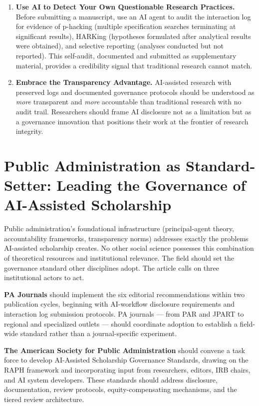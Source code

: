 \documentclass[12pt]{article}
\begin{document}
\begin{enumerate}
\item \textbf{Use AI to Detect Your Own Questionable Research Practices.}
Before submitting a manuscript, use an AI agent to audit the interaction log for evidence
of p-hacking (multiple specification searches terminating at significant results), HARKing
(hypotheses formulated after analytical results were obtained), and selective reporting
(analyses conducted but not reported). This self-audit, documented and submitted as
supplementary material, provides a credibility signal that traditional research cannot
match.

\item \textbf{Embrace the Transparency Advantage.}
AI-assisted research with preserved logs and documented governance protocols should be
understood as \emph{more} transparent and \emph{more} accountable than traditional research
with no audit trail. Researchers should frame AI disclosure not as a limitation but as a
governance innovation that positions their work at the frontier of research integrity.

\end{enumerate}

\section{Public Administration as Standard-Setter: Leading the Governance of AI-Assisted Scholarship}

Public administration's foundational infrastructure (principal-agent theory, accountability
frameworks, transparency norms) addresses exactly the problems AI-assisted scholarship
creates. No other social science possesses this combination of theoretical resources and
institutional relevance. The field should set the governance standard other disciplines adopt.
The article calls on three institutional actors to act.

\textbf{PA Journals} should implement the six editorial recommendations within two
publication cycles, beginning with AI-workflow disclosure requirements and interaction log
submission protocols. PA journals --- from PAR and JPART to regional and specialized outlets --- should coordinate
adoption to establish a field-wide standard rather than a journal-specific experiment.

\textbf{The American Society for Public Administration} should convene a task force to
develop AI-Assisted Scholarship Governance Standards, drawing on the RAPH framework and
incorporating input from researchers, editors, IRB chairs, and AI system developers. These
standards should address disclosure, documentation, review protocols, equity-compensating
mechanisms, and the tiered review architecture.
\end{document}
